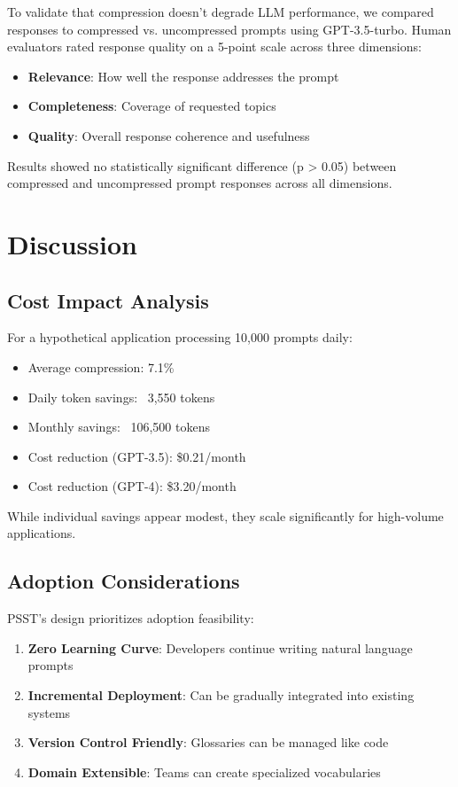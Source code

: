 \documentclass[11pt,twocolumn]{article}
\begin{document}
To validate that compression doesn't degrade LLM performance, we compared responses to compressed vs. uncompressed prompts using GPT-3.5-turbo. Human evaluators rated response quality on a 5-point scale across three dimensions:

\begin{itemize}
\item \textbf{Relevance}: How well the response addresses the prompt
\item \textbf{Completeness}: Coverage of requested topics
\item \textbf{Quality}: Overall response coherence and usefulness
\end{itemize}

Results showed no statistically significant difference (p > 0.05) between compressed and uncompressed prompt responses across all dimensions.

\section{Discussion}

\subsection{Cost Impact Analysis}

For a hypothetical application processing 10,000 prompts daily:

\begin{itemize}
\item Average compression: 7.1\%
\item Daily token savings: ~3,550 tokens
\item Monthly savings: ~106,500 tokens
\item Cost reduction (GPT-3.5): \$0.21/month
\item Cost reduction (GPT-4): \$3.20/month
\end{itemize}

While individual savings appear modest, they scale significantly for high-volume applications.

\subsection{Adoption Considerations}

PSST's design prioritizes adoption feasibility:

\begin{enumerate}
\item \textbf{Zero Learning Curve}: Developers continue writing natural language prompts
\item \textbf{Incremental Deployment}: Can be gradually integrated into existing systems
\item \textbf{Version Control Friendly}: Glossaries can be managed like code
\item \textbf{Domain Extensible}: Teams can create specialized vocabularies
\end{enumerate}
\end{document}
